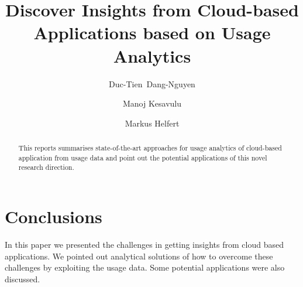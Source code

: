 \documentclass{llncs}
\begin{document}
\title{Discover Insights from Cloud-based Applications based on Usage Analytics}


\author{Duc-Tien~Dang-Nguyen \and Manoj Kesavulu \and Markus Helfert }


\maketitle

\setcounter{footnote}{0}

\begin{abstract}
This reports summarises state-of-the-art approaches for usage analytics of cloud-based application from usage data and point out the potential applications of this novel research direction.
\end{abstract}











\section{Conclusions}
In this paper we presented the challenges in getting insights from cloud based applications. We pointed out analytical solutions of how to overcome these challenges by exploiting the usage data. Some potential applications were also discussed.

\nocite{*}



%
%
%
\end{document}
